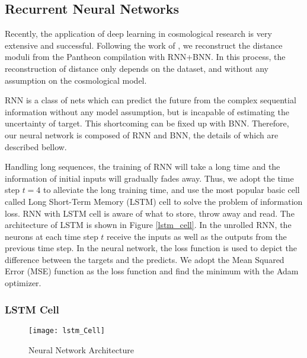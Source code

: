 \subsection{Recurrent Neural Networks}
Recently, the application of deep learning in cosmological research is very extensive and successful. Following the work of \cite{escamilla2020deep}, we reconstruct the distance moduli from the Pantheon compilation \cite{scolnic2018complete} with RNN+BNN. In this process, the reconstruction of distance only depends on the dataset, and without any assumption on the cosmological model.

RNN\cite{goodfellow2016deep} is a class of nets which can predict the future from the complex sequential information without any model assumption, but is incapable of estimating the uncertainty of target. This shortcoming can be fixed up with BNN. Therefore, our neural network is composed of RNN and BNN, the details of which are described bellow.

Handling long sequences, the training of RNN will take a long time and the information of initial inputs will gradually fades away. Thus, we adopt the time step $t=4$ to alleviate the long training time, and use the most popular basic cell called Long Short-Term Memory (LSTM) cell to solve the problem of information loss. RNN with LSTM cell is aware of what to store, throw away and read. The architecture of LSTM is shown in Figure \eqref{lstm_cell}. In the unrolled RNN, the neurons at each time step $t$ receive the inputs as well as the outputs from the previous time step. In the neural network, the loss function is used to depict the difference between the targets and the predicts. We adopt the Mean Squared Error (MSE) function as the loss function and find the minimum with the Adam optimizer.

\subsubsection{LSTM Cell}
\begin{figure} [H]
	\centering
	\texttt{[image: lstm\_Cell]}
	\caption{Neural Network Architecture}
	\label{lstm_cell}
\end{figure}

